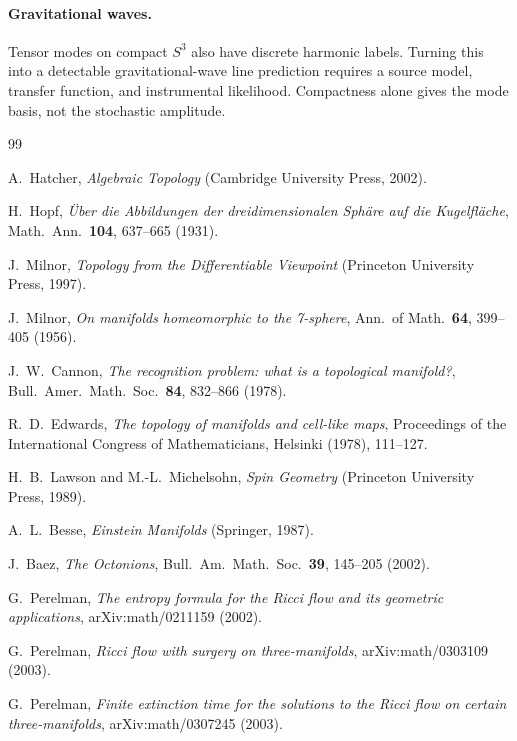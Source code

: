\documentclass[11pt,a4paper]{article}
\theoremstyle{definition}
\theoremstyle{remark}
\newcommand{\Sthree}{S^{3}}
\begin{document}
\paragraph{Gravitational waves.}
Tensor modes on compact $\Sthree$ also have discrete harmonic labels.  Turning this into a
detectable gravitational-wave line prediction requires a source model, transfer function, and
instrumental likelihood.  Compactness alone gives the mode basis, not the stochastic amplitude.

\begin{thebibliography}{99}

A.~Hatcher, \emph{Algebraic Topology} (Cambridge University Press, 2002).

H.~Hopf, \emph{\"Uber die Abbildungen der dreidimensionalen Sph\"are auf die Kugelfl\"ache},
Math.\ Ann.\ \textbf{104}, 637--665 (1931).

J.~Milnor, \emph{Topology from the Differentiable Viewpoint} (Princeton University Press, 1997).

J.~Milnor, \emph{On manifolds homeomorphic to the 7-sphere},
Ann.\ of Math.\ \textbf{64}, 399--405 (1956).

J.~W.~Cannon, \emph{The recognition problem: what is a topological manifold?},
Bull.\ Amer.\ Math.\ Soc.\ \textbf{84}, 832--866 (1978).

R.~D.~Edwards, \emph{The topology of manifolds and cell-like maps},
Proceedings of the International Congress of Mathematicians, Helsinki (1978), 111--127.

H.~B.~Lawson and M.-L.~Michelsohn, \emph{Spin Geometry} (Princeton University Press, 1989).

A.~L.~Besse, \emph{Einstein Manifolds} (Springer, 1987).

J.~Baez, \emph{The Octonions}, Bull.\ Am.\ Math.\ Soc.\ \textbf{39}, 145--205 (2002).

G.~Perelman, \emph{The entropy formula for the Ricci flow and its geometric applications},
arXiv:math/0211159 (2002).

G.~Perelman, \emph{Ricci flow with surgery on three-manifolds},
arXiv:math/0303109 (2003).

G.~Perelman, \emph{Finite extinction time for the solutions to the Ricci flow on certain
three-manifolds}, arXiv:math/0307245 (2003).


\end{thebibliography}
\end{document}
